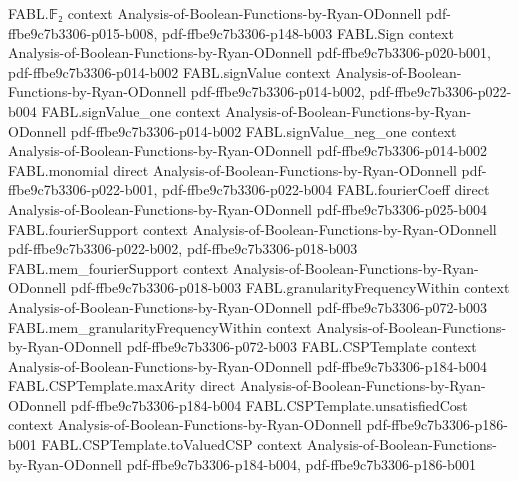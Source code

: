 \begin{theorem}
\label{FABL.maxArity_maxE3LinTemplate}
\leanok
{}
\proofstep
  {FABL.𝔽₂}
  {context}
  {Analysis-of-Boolean-Functions-by-Ryan-ODonnell}
  {pdf-ffbe9c7b3306-p015-b008,
    pdf-ffbe9c7b3306-p148-b003}
\proofstep
  {FABL.Sign}
  {context}
  {Analysis-of-Boolean-Functions-by-Ryan-ODonnell}
  {pdf-ffbe9c7b3306-p020-b001,
    pdf-ffbe9c7b3306-p014-b002}
\proofstep
  {FABL.signValue}
  {context}
  {Analysis-of-Boolean-Functions-by-Ryan-ODonnell}
  {pdf-ffbe9c7b3306-p014-b002,
    pdf-ffbe9c7b3306-p022-b004}
\proofstep
  {FABL.signValue_one}
  {context}
  {Analysis-of-Boolean-Functions-by-Ryan-ODonnell}
  {pdf-ffbe9c7b3306-p014-b002}
\proofstep
  {FABL.signValue_neg_one}
  {context}
  {Analysis-of-Boolean-Functions-by-Ryan-ODonnell}
  {pdf-ffbe9c7b3306-p014-b002}
\proofstep
  {FABL.monomial}
  {direct}
  {Analysis-of-Boolean-Functions-by-Ryan-ODonnell}
  {pdf-ffbe9c7b3306-p022-b001,
    pdf-ffbe9c7b3306-p022-b004}
\proofstep
  {FABL.fourierCoeff}
  {direct}
  {Analysis-of-Boolean-Functions-by-Ryan-ODonnell}
  {pdf-ffbe9c7b3306-p025-b004}
\proofstep
  {FABL.fourierSupport}
  {context}
  {Analysis-of-Boolean-Functions-by-Ryan-ODonnell}
  {pdf-ffbe9c7b3306-p022-b002,
    pdf-ffbe9c7b3306-p018-b003}
\proofstep
  {FABL.mem_fourierSupport}
  {context}
  {Analysis-of-Boolean-Functions-by-Ryan-ODonnell}
  {pdf-ffbe9c7b3306-p018-b003}
\proofstep
  {FABL.granularityFrequencyWithin}
  {context}
  {Analysis-of-Boolean-Functions-by-Ryan-ODonnell}
  {pdf-ffbe9c7b3306-p072-b003}
\proofstep
  {FABL.mem_granularityFrequencyWithin}
  {context}
  {Analysis-of-Boolean-Functions-by-Ryan-ODonnell}
  {pdf-ffbe9c7b3306-p072-b003}
\proofstep
  {FABL.CSPTemplate}
  {context}
  {Analysis-of-Boolean-Functions-by-Ryan-ODonnell}
  {pdf-ffbe9c7b3306-p184-b004}
\proofstep
  {FABL.CSPTemplate.maxArity}
  {direct}
  {Analysis-of-Boolean-Functions-by-Ryan-ODonnell}
  {pdf-ffbe9c7b3306-p184-b004}
\proofstep
  {FABL.CSPTemplate.unsatisfiedCost}
  {context}
  {Analysis-of-Boolean-Functions-by-Ryan-ODonnell}
  {pdf-ffbe9c7b3306-p186-b001}
\proofstep
  {FABL.CSPTemplate.toValuedCSP}
  {context}
  {Analysis-of-Boolean-Functions-by-Ryan-ODonnell}
  {pdf-ffbe9c7b3306-p184-b004,
    pdf-ffbe9c7b3306-p186-b001}
\proofstep

\end{theorem}
